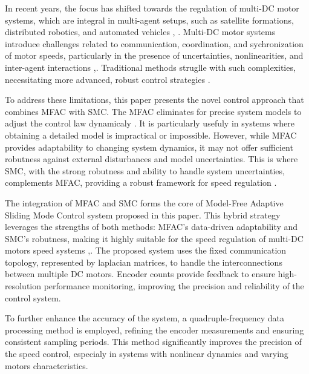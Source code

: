 \documentclass[journal,onecolumn]{IEEEtran}
\begin{document}
In recent years, the focus has shifted towards the regulation of multi-DC motor systems, which are integral in multi-agent setups, such as satellite formations, distributed robotics, and automated vehicles \cite{2}, \cite{3}. Multi-DC motor systems introduce challenges related to communication, coordination, and sychronization of motor speeds, particularly in the presence of uncertainties, nonlinearities, and inter-agent interactions \cite{4},\cite{5}. Traditional methods struglle with such complexities, necessitating more advanced, robust control strategies \cite{7}.

To address these limitations, this paper presents the novel control approach that combines MFAC with SMC. The MFAC eliminates for precise system models to adjust the control law dynamicaly \cite{8}. It is particularly usefuly in systems where obtaining a detailed model is impractical or impossible. However, while MFAC provides adaptability to changing system dynamics, it may not offer sufficient robutness against external disturbances and model uncertainties. This is where SMC, with the strong robutness and ability to handle system uncertainties, complements MFAC, providing a robust framework for speed regulation \cite{14}.

The integration of MFAC and SMC forms the core of Model-Free Adaptive Sliding Mode Control system proposed in this paper. This hybrid strategy leverages the strengths of both methods: MFAC's data-driven adaptability and SMC's robutness, making it highly suitable for the speed regulation of multi-DC motors speed systems \cite{15},\cite{16}. The proposed system uses the fixed communication topology, represented by laplacian matrices, to handle the interconnections between multiple DC motors. Encoder counts provide feedback to ensure high-resolution performance monitoring, improving the precision and reliability of the control system.

To further enhance the accuracy of the system, a quadruple-frequency data processing method is employed, refining the encoder measurements and ensuring consistent sampling periods. This method significantly improves the precision of the speed control, especialy in systems with nonlinear dynamics and varying motors characteristics.
\end{document}
